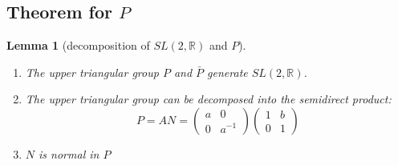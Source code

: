 \documentclass[
  12pt
]{article}
\theoremstyle{break}
\theoremstyle{plain}
\newtheorem{lem}[thm]{Lemma}
\newcommand{\sltr}{\ensuremath{SL(2, \mathbb{R})}\xspace}
\begin{document}
  \hypertarget{theorem-for-p}{%
  \subsection{Theorem for \texorpdfstring{$P$}{P}}\label{theorem-for-p}}

  \begin{lem}[decomposition of \sltr and $P$]
    \label{ref:lem:decomp}
    \begin{enumerate}
      \item The upper triangular group $P$ and $\bar{P}$ generate \sltr.
      \item The upper triangular group can be decomposed into the semidirect product:
        $$
        P = AN = \begin{pmatrix}a & 0 \\ 0 & a^{-1}\end{pmatrix} \begin{pmatrix}1 & b \\ 0 & 1\end{pmatrix}
        $$
      \item $N$ is normal in $P$
    \end{enumerate}
     
  \end{lem}
\end{document}
